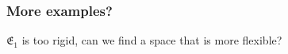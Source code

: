 \documentclass[aspectratio=169]{beamer}
\begin{document}
\begin{frame}
    \frametitle{More examples?}
    $\mathfrak{E_1}$ is too rigid, can we find a space that is more flexible?
    \begin{columns}
        \begin{column}{0.5\textwidth}
            \begin{figure}[ht]\centering
            \end{figure}
        \end{column}
        \begin{column}{0.5\textwidth}
            \begin{figure}[ht]\centering

\end{figure}
\end{column}
\end{columns}
\end{frame}
\end{document}
